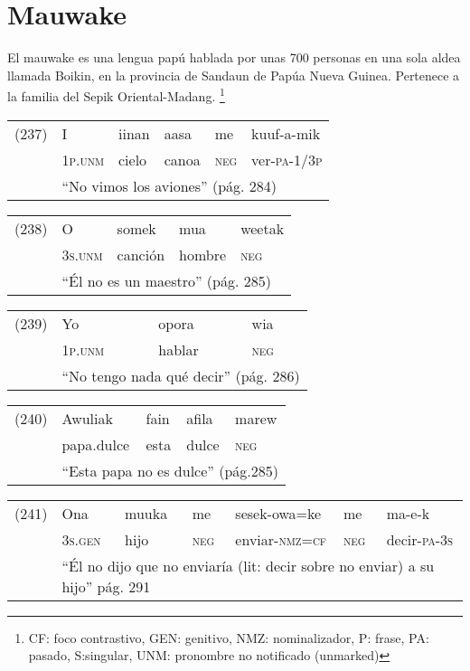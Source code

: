 \section*{Mauwake}

\noindent El mauwake es una lengua papú hablada por unas 700 personas en una sola aldea llamada Boikin, en la provincia de Sandaun de Papúa Nueva Guinea. Pertenece a la familia del Sepik Oriental-Madang.
\footnote{CF: foco contrastivo, GEN: genitivo, NMZ: nominalizador, P: frase, PA: pasado, S:singular, UNM: pronombre no notificado (unmarked)}
\vspace{0.5cm}

{\setmainfont{Charis SIL} 

\begin{tabular}{llllll}
(237) & I & iinan & aasa & me & kuuf-a-mik \\
& \textsc{1p.unm} & cielo & canoa & \textsc{neg} & ver-\textsc{pa-1/3p} \\
& \multicolumn{5}{l}{``No vimos los aviones'' (pág. 284)}
\end{tabular} \vspace{0.5cm}

\begin{tabular}{lllll}
(238) & O & somek & mua & weetak \\
& \textsc{3s.unm} & canción & hombre & \textsc{neg} \\
& \multicolumn{4}{l}{``Él no es un maestro'' (pág. 285)}
\end{tabular} \vspace{0.5cm}

\begin{tabular}{llll}
(239) & Yo & opora & wia \\
& \textsc{1p.unm} & hablar & \textsc{neg} \\
& \multicolumn{3}{l}{``No tengo nada qué decir'' (pág. 286)}
\end{tabular} \vspace{0.5cm}

\begin{tabular}{lllll}
(240) & Awuliak & fain & afila & marew \\
&  papa.dulce & esta & dulce & \textsc{neg} \\
& \multicolumn{4}{l}{``Esta papa no es dulce'' (pág.285)}
\end{tabular} \vspace{0.5cm}

\begin{tabular}{lllllll}
(241) & Ona & muuka & me & sesek-owa=ke & me & ma-e-k \\
& \textsc{3s.gen} & hijo & \textsc{neg} & enviar-\textsc{nmz=cf} & \textsc{neg} & decir-\textsc{pa-3s} \\
& \multicolumn{6}{l}{``Él no dijo que no enviaría (lit: decir sobre no enviar) a su hijo'' pág. 291}
\end{tabular} \vspace{0.5cm}

}

